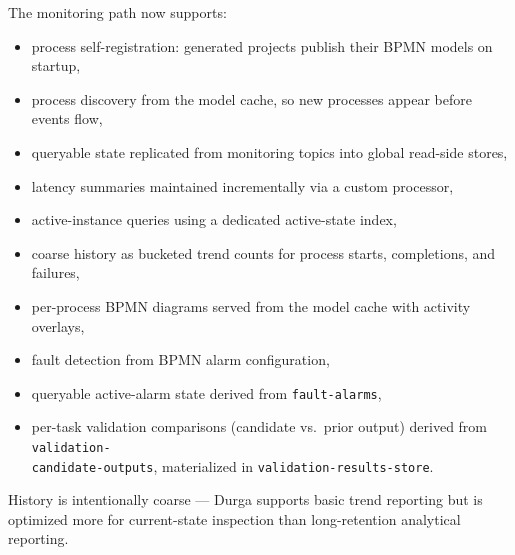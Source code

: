 The monitoring path now supports:
\begin{itemize}
\item process self-registration: generated projects publish their BPMN models on startup,
\item process discovery from the model cache, so new processes appear before events flow,
\item queryable state replicated from monitoring topics into global read-side stores,
\item latency summaries maintained incrementally via a custom processor,
\item active-instance queries using a dedicated active-state index,
\item coarse history as bucketed trend counts for process starts, completions, and failures,
\item per-process BPMN diagrams served from the model cache with activity overlays,
\item fault detection from BPMN alarm configuration,
\item queryable active-alarm state derived from \texttt{fault-alarms},
\item per-task validation comparisons (candidate vs.\ prior output) derived from
      \texttt{validation-\\candidate-outputs}, materialized in
      \texttt{validation-results-store}.
\end{itemize}

History is intentionally coarse — Durga supports basic trend reporting but is
optimized more for current-state inspection than long-retention analytical
reporting.
